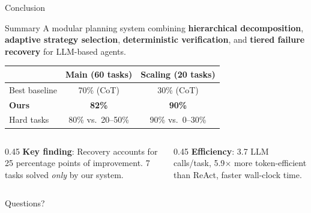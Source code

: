 \documentclass[aspectratio=169]{beamer}
\begin{document}
\begin{frame}{Conclusion}

\begin{block}{Summary}
A modular planning system combining \textbf{hierarchical decomposition}, \textbf{adaptive strategy selection}, \textbf{deterministic verification}, and \textbf{tiered failure recovery} for LLM-based agents.
\end{block}

\vspace{0.3cm}
\centering
\begin{tabular}{lcc}
\toprule
& \textbf{Main (60 tasks)} & \textbf{Scaling (20 tasks)} \\
\midrule
Best baseline & 70\% (CoT) & 30\% (CoT) \\
\textbf{Ours} & \textbf{82\%} & \textbf{90\%} \\
\midrule
Hard tasks & 80\% vs.\ 20--50\% & 90\% vs.\ 0--30\% \\
\bottomrule
\end{tabular}

\vspace{0.3cm}
\begin{columns}[T]
\begin{column}{0.45\textwidth}
\small
\textbf{Key finding}: Recovery accounts for 25 percentage points of improvement. 7 tasks solved \textit{only} by our system.
\end{column}
\begin{column}{0.45\textwidth}
\small
\textbf{Efficiency}: 3.7 LLM calls/task, 5.9$\times$ more token-efficient than ReAct, faster wall-clock time.
\end{column}
\end{columns}

\vspace{0.4cm}
\centering
\Large \textcolor{mainblue}{Questions?}

\end{frame}
\end{document}
